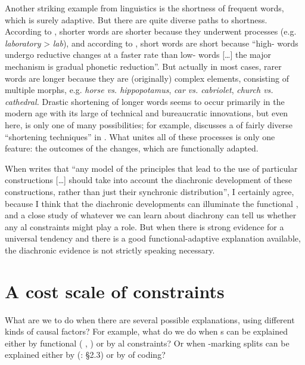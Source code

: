 \documentclass[output=paper]{langsci/langscibook}
\begin{document}
\largerpage
Another striking example from linguistics is the shortness of frequent words, which is surely adaptive. But there are quite diverse paths to shortness. According to \citet{Zipf1935}, shorter words are shorter because they underwent  processes (e.g. \textit{laboratory} > \textit{lab}), and according to \citet[12]{Bybee2007}, short words are short because “high- words undergo reductive changes at a faster rate than low- words […] the major mechanism is gradual phonetic reduction”. But actually in most cases, rarer words are longer because they are (originally) complex elements, consisting of multiple morphs, e.g. \textit{horse vs. hippopotamus}, \textit{car vs. cabriolet}, \textit{church vs. cathedral.} Drastic shortening of longer words seems to occur primarily in the modern age with its large  of technical and bureaucratic innovations, but even here,  is only one of many possibilities; for example, \citet{RonnebergerSibold2014} discusses a  of fairly diverse “shortening techniques” in . What unites all of these processes is only one feature: the outcomes of the changes, which are functionally adapted.


When \citet[297]{Cristofaro2014} writes that “any model of the principles that lead to the use of particular constructions […] should take into account the diachronic development of these constructions, rather than just their synchronic distribution”, I certainly agree, because I think that the diachronic developments can illuminate the functional , and a close study of whatever we can learn about diachrony can tell us whether any al constraints might play a role. But when there is strong evidence for a universal tendency and there is a good functional-adaptive explanation available, the diachronic evidence is not strictly speaking necessary.\label{p:haspelmath:strictlyspeakingnecessary}

\section{A cost scale of constraints}\label{sec:haspelmath:7}

What are we to do when there are several possible explanations, using different kinds of causal factors? For example, what do we do when s can be explained either by functional  ( , \citealt{Hawkins2014_VarEff}) or by al constraints? Or when -marking splits can be explained either by  (\citealt{Kiparsky2008}: §2.3) or by  of coding?
\end{document}
